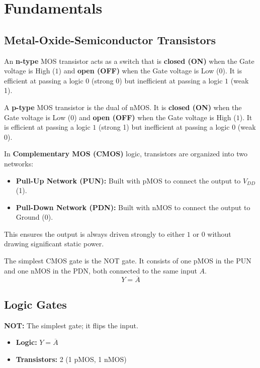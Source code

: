 \section{Fundamentals}

\subsection{Metal-Oxide-Semiconductor Transistors}
\begin{definition}
	An \textbf{n-type} MOS transistor acts as a switch that is \textbf{closed (ON)} when the Gate voltage is High ($1$) and \textbf{open (OFF)} when the Gate voltage is Low ($0$). It is efficient at passing a logic $0$ (strong 0) but inefficient at passing a logic $1$ (weak 1).
\end{definition}

\begin{definition}
	A \textbf{p-type} MOS transistor is the dual of nMOS. It is \textbf{closed (ON)} when the Gate voltage is Low ($0$) and \textbf{open (OFF)} when the Gate voltage is High ($1$). It is efficient at passing a logic $1$ (strong 1) but inefficient at passing a logic $0$ (weak 0).
\end{definition}

\begin{definition}
	In \textbf{Complementary MOS (CMOS)} logic, transistors are organized into two networks:
	\begin{itemize}
		\item \textbf{Pull-Up Network (PUN):} Built with pMOS to connect the output to $V_{DD}$ (1).
		\item \textbf{Pull-Down Network (PDN):} Built with nMOS to connect the output to Ground (0).
	\end{itemize}
	This ensures the output is always driven strongly to either $1$ or $0$ without drawing significant static power.
\end{definition}

\begin{example}
	The simplest CMOS gate is the NOT gate. It consists of one pMOS in the PUN and one nMOS in the PDN, both connected to the same input $A$.
	$$Y = \overline{A}$$
\end{example}

\subsection{Logic Gates}

\begin{definition}
	\textbf{NOT:} The simplest gate; it flips the input.
	\begin{itemize}
		\item \textbf{Logic:} $Y = \overline{A}$
		\item \textbf{Transistors:} 2 (1 pMOS, 1 nMOS)
	\end{itemize}
\end{definition}

